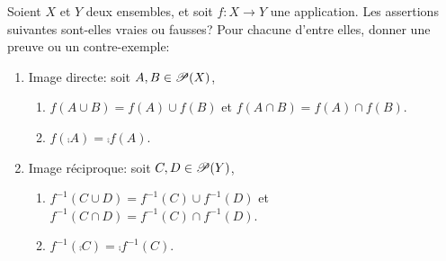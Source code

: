 {\begin{td-sol}[]
\begin{enumerate}
        \end{enumerate}
        
    \end{td-sol}
}{}
\begin{td-exo}
    Soient \(X\) et \(Y\) deux ensembles, et soit \(f:X\to Y\) une application. 
    Les assertions suivantes sont-elles vraies ou fausses? Pour chacune d'entre
    elles, donner une preuve ou un contre-exemple:
    \begin{enumerate}
        \item Image directe: soit \(A,B\in\mathscr{P}(X)\),
            \begin{enumerate}
                \item \(f(A\cup B) = f(A)\cup f(B)\) et \(f(A\cap B) = f(A)\cap f(B)\).
                \item \(f(\comp{A})=\comp{f(A)}\).
            \end{enumerate}
        \item Image réciproque: soit \(C,D\in\mathscr{P}(Y)\),
            \begin{enumerate}
                \item \(f^{-1}(C\cup D) = f^{-1}(C)\cup f^{-1}(D)\) et \(f^{-1}(C\cap D) = f^{-1}(C)\cap f^{-1}(D)\).
                \item \(f^{-1}(\comp{C})=\comp{f^{-1}(C)}\).
            \end{enumerate}
    \end{enumerate}
\end{td-exo}
